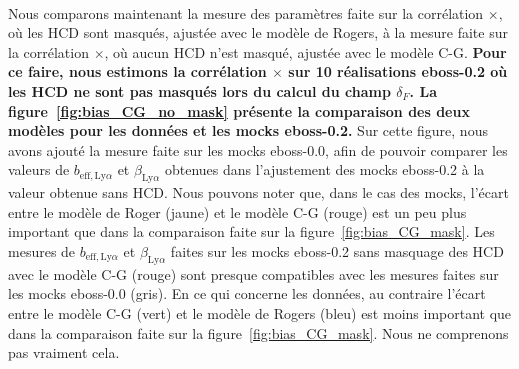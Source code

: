 \documentclass[11pt, twoside, a4paper, openright]{report}
\begin{document}
\paragraph{}
Nous comparons maintenant la mesure des paramètres \lya{} faite sur la corrélation \lya{}$\times$\lya{}, où les HCD sont masqués, ajustée avec le modèle de Rogers, à la mesure faite sur la corrélation \lya{}$\times$\lya{}, où aucun HCD n'est masqué, ajustée avec le modèle C-G.
\textbf{Pour ce faire, nous estimons la corrélation \lya{}$\times$\lya{} sur \num{10} réalisations eboss-0.2 où les HCD ne sont pas masqués lors du calcul du champ $\delta_F$.
La figure~\ref{fig:bias_CG_no_mask} présente la comparaison des deux modèles pour les données et les mocks eboss-0.2.}
Sur cette figure, nous avons ajouté la mesure faite sur les mocks eboss-0.0, afin de pouvoir comparer les valeurs de $b_{\mathrm{eff},\mathrm{Ly}\alpha}$ et  $\beta_{\mathrm{Ly}\alpha}$ obtenues dans l'ajustement des mocks eboss-0.2 à la valeur obtenue sans HCD.
Nous pouvons noter que, dans le cas des mocks, l'écart entre le modèle de Roger (jaune) et le modèle C-G (rouge) est un peu plus important que dans la comparaison faite sur la figure~\ref{fig:bias_CG_mask}.
Les mesures de $b_{\mathrm{eff},\mathrm{Ly}\alpha}$ et  $\beta_{\mathrm{Ly}\alpha}$ faites sur les mocks eboss-0.2 sans masquage des HCD avec le modèle C-G (rouge) sont presque compatibles avec les mesures faites sur les mocks eboss-0.0 (gris).
En ce qui concerne les données, au contraire l'écart entre le modèle C-G (vert) et le modèle de Rogers (bleu) est moins important que dans la comparaison faite sur la figure~\ref{fig:bias_CG_mask}. Nous ne comprenons pas vraiment cela.
\end{document}
